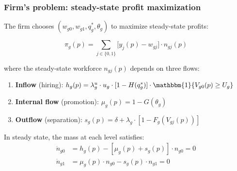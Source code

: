\documentclass[aspectratio=169, 11pt]{beamer}
\begin{document}
\begin{frame}
\frametitle{Firm's problem: steady-state profit maximization}

The firm chooses $(w_{g0}, w_{g1}, q_g^*, \theta_g)$ to maximize steady-state profits:

\begin{equation*}
    \pi_g(p) = \sum_{j \in \{0,1\}} \bigl[y_{j}(p) - w_{gj}\bigr] \cdot n_{gj}(p)
\end{equation*}

where the steady-state workforce $n_{gj}(p)$ depends on three flows:

\vspace{0.2cm}
\begin{enumerate}
    \item \textbf{Inflow} (hiring): $h_g(p) = \lambda_g^u \cdot u_g \cdot [1 - H(q_g^*)] \cdot \mathbbm{1}\{V_{g0}(p) \geq U_g\}$
    \medskip
    \item \textbf{Internal flow} (promotion): $\mu_g(p) = 1 - G(\theta_g)$
    \medskip
    \item \textbf{Outflow} (separation): $s_g(p) = \delta + \lambda_g \cdot [1 - F_g(V_{gj}(p))]$
\end{enumerate}

\vspace{0.3cm}
In steady state, the mass at each level satisfies:
\begin{align*}
    \dot{n}_{g0} &= h_g(p) - [\mu_g(p) + s_g(p)] \cdot n_{g0} = 0 \\
    \dot{n}_{g1} &= \mu_g(p) \cdot n_{g0} - s_g(p) \cdot n_{g1} = 0
\end{align*}

\end{frame}
\end{document}
